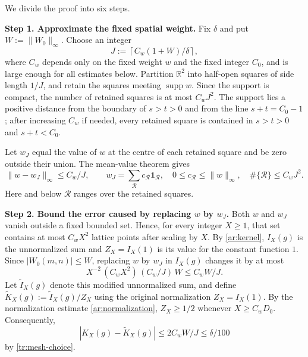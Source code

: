 \documentclass[twoside]{aomart}
\makeatletter
\theoremstyle{paperplain}
\theoremstyle{paperdefinition}
\renewenvironment{proof}[1][\proofname]{\par\pushQED{\qed}%
  \normalfont\topsep6\p@\@plus3\p@\relax\trivlist
  \item[\hskip\labelsep\itshape #1\@addpunct{.}]\ignorespaces
}{\popQED\endtrivlist\@endpefalse}
\numberwithin{equation}{section}
\makeatother
\begin{document}
\begin{proof}
We divide the proof into six steps.	
	
\par
\medskip
\noindent\textbf{Step 1. Approximate the fixed spatial weight.}
Fix $\delta$ and put
$W:=\|W_0\|_\infty$.  Choose an integer
\begin{equation}
 J:=\left\lceil C_w(1+W)/\delta\right\rceil,
 \label{tr:mesh-choice}
\end{equation}
where $C_w$ depends only on the fixed weight $w$ and the fixed integer
$C_0$, and is large enough for
all estimates below.  Partition $\mathbb R^2$ into half-open squares of
side length $1/J$, and retain the squares meeting $\operatorname{supp}w$.
Since the support is compact, the number of retained squares is at most
$C_wJ^2$.  The support lies a positive distance from the boundary of
$s>t>0$ and from the line $s+t=C_0-1$; after increasing $C_w$ if needed,
every retained square is contained in
$s>t>0$ and $s+t<C_0$.

Let $w_J$ equal the value of $w$ at the centre of each retained square and
be zero outside their union.  The mean-value theorem gives
\begin{equation*}
 \|w-w_J\|_\infty\le C_w/J,
 \qquad
 w_J=\sum_{\mathcal R}c_{\mathcal R}\mathbf 1_{\mathcal R},
 \quad 0\le c_{\mathcal R}\le\|w\|_\infty,
 \quad \#\{\mathcal R\}\le C_wJ^2.
\end{equation*}
Here and below $\mathcal R$ ranges over the retained squares.

\par
\medskip
\noindent\textbf{Step 2. Bound the error caused by replacing $w$ by $w_J$.}
Both $w$ and $w_J$ vanish outside a fixed bounded set.  Hence, for every
integer $X\ge1$, that set contains at most $C_wX^2$ lattice points after
scaling by $X$.  By \eqref{ar:kernel}, $I_X(g)$ is the unnormalized sum
and $Z_X=I_X(1)$ is its value for the constant function $1$.  Since
$|W_0(m,n)|\le W$, replacing $w$ by $w_J$ in $I_X(g)$ changes it by at most
\[
 X^{-2}\,(C_wX^2)\,(C_w/J)\,W\le C_wW/J.
\]
Let $\widetilde I_X(g)$ denote this modified unnormalized sum, and define
$\widetilde K_X(g):=\widetilde I_X(g)/Z_X$ using the original normalization
$Z_X=I_X(1)$.  By the normalization estimate \eqref{ar:normalization},
$Z_X\ge1/2$ whenever $X\ge C_wD_0$.  Consequently,
\[
 |K_X(g)-\widetilde K_X(g)|\le 2C_wW/J\le\delta/100
\]
by \eqref{tr:mesh-choice}.


\end{proof}
\end{document}
